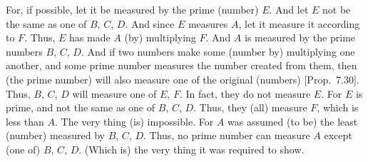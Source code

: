 \begin{Parallel}{}{}
{For, if possible, let it be measured by the prime (number) $E$. And
let $E$ not be the same as one of $B$, $C$, $D$. And since $E$ measures
$A$, let it measure it according to $F$.  Thus, $E$ has made $A$ (by)
multiplying $F$. And $A$ is measured by the prime numbers $B$, $C$, $D$.
And if two numbers make some (number by) multiplying one another,
and some prime number  measures the number created from them, then (the prime number)
will also measure one of the original (numbers) [Prop.~7.30]. Thus, $B$, $C$, $D$ will measure one of
$E$, $F$. In fact, they do not measure $E$. For $E$ is prime, and not the
same as one of $B$, $C$, $D$. Thus, they (all) measure $F$, which is less than $A$. The very thing (is) impossible. For $A$ was assumed
(to be) the least (number) measured by $B$, $C$, $D$. Thus, no prime number can measure $A$ except (one of) $B$, $C$, $D$. (Which is) the very thing it was required to show.}
\end{Parallel}

